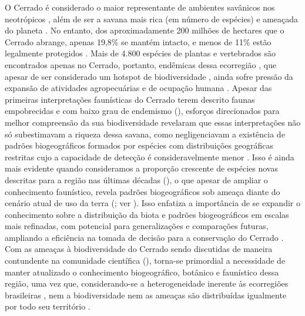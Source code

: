 \documentclass[12pt,openright,oneside,a4paper,english]{abntex2}
\begin{document}
O Cerrado é considerado o maior representante de ambientes savânicos nos neotrópicos \citep{Silva2002}, além de ser a savana mais rica (em número de espécies) e ameaçada do planeta \citep{KlinkMachado2005}. No entanto, dos aproximadamente 200 milhões de hectares que o Cerrado abrange, apenas 19,8\% se mantém intacto, e menos de 11\% estão legalmente protegidos \citep{Strassburg2017, VieiraAlencar2023}. Mais de 4.800 espécies de plantas e vertebrados são encontrados apenas no Cerrado, portanto, endêmicas dessa ecorregião \citep{Strassburg2017}, que apesar de ser considerado um hotspot de biodiversidade \citep{Myers2000}, ainda sofre pressão da expansão de atividades agropecuárias e de ocupação humana \citep{KlinkMachado2005, Strassburg2017}. Apesar das primeiras interpretações faunísticas do Cerrado terem descrito faunas empobrecidas e com baixo grau de endemismo (\citealp[ver revisão em][]{Nogueira2010}), esforços direcionados para melhor compreensão da sua biodiversidade revelaram que essas interpretações não só subestimavam a riqueza dessa savana, como negligenciavam a existência de padrões biogeográficos formados por espécies com distribuições geográficas restritas cujo a capacidade de detecção é consideravelmente menor \citep{Gaston1996}. Isso é ainda mais evidente quando consideramos a proporção crescente de espécies novas descritas para a região nas últimas décadas (\citealp[ver][]{Nogueira2010}), o que apesar de ampliar o conhecimento faunístico, revela padrões biogeográficos sob ameaça diante do cenário atual de uso da terra (\citealp{Strassburg2017}; ver ). Isso enfatiza a importância de se expandir o conhecimento sobre a distribuição da biota e padrões biogeográficos em escalas mais refinadas, com potencial para generalizações e comparações futuras, ampliando a eficiência na tomada de decisão para a conservação do Cerrado \citep{DinizFilho2008}. Com as ameaças à biodiversidade do Cerrado sendo discutidas de maneira contundente na comunidade científica (\citealp[e.g][]{KlinkMachado2005, Strassburg2017, Velazco2019, Pacheco2021}), torna-se primordial a necessidade de manter atualizado o conhecimento biogeográfico, botânico e faunístico dessa região, uma vez que, considerando-se a heterogeneidade inerente às ecorregiões brasileiras \citep{Ratter2003, Bridgewater2004}, nem a biodiversidade nem as ameaças são distribuídas igualmente por todo seu território \citep{Ratter2003, KlinkMachado2005, Nogueira2011, Azevedo2016, Carmignotto2022}.
\end{document}
